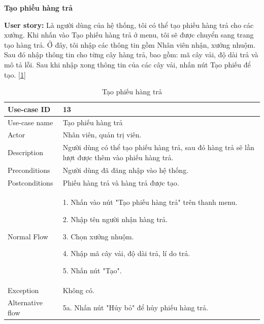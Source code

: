 \newpage
\textbf{Tạo phiếu hàng trả}\par
\textbf{User story:} Là người dùng của hệ thống, tôi có thể tạo phiếu hàng trả cho các xưởng. Khi nhấn vào Tạo phiếu hàng trả ở menu, tôi sẽ được chuyển sang trang tạo hàng trả. Ở đây, tôi nhập các thông tin gồm Nhân viên nhận, xưởng nhuộm. Sau đó nhập thông tin cho từng cây hàng trả, bao gồm: mã cây vải, độ dài trả và mô tả lỗi. Sau khi nhập xong thông tin của các cây vải, nhấn nút Tạo phiếu để tạo. [\ref{bang13}]
\begin{table}[!htp]
    \centering
    \begin{tabular}{|m{3cm}|m{10cm}|}
    \hline 
        Use-case ID & 13\\ \hline
        Use-case name & Tạo phiếu hàng trả\\ \hline
        Actor & Nhân viên, quản trị viên.\\ \hline
        Description & Người dùng có thể tạo phiếu hàng trả, sau đó hàng trả sẽ lần lượt được thêm vào phiếu hàng trả.\\ \hline
        Preconditions & Người dùng đã đăng nhập vào hệ thống.\\ \hline
        Postconditions & Phiếu hàng trả và hàng trả được tạo.\\ \hline
        Normal Flow & 
        1. Nhấn vào nút "Tạo phiếu hàng trả" trên thanh menu.\par 
        2. Nhập tên người nhận hàng trả.\par
        3. Chọn xưởng nhuộm.\par 
        4. Nhập mã cây vải, độ dài trả, lí do trả.\par
        5. Nhấn nút "Tạo".
        \\ \hline
        Exception & Không có.
        \\ \hline
        Alternative flow & 
        5a. Nhấn nút "Hủy bỏ" để hủy phiếu hàng trả.
        \\ 
    \hline 
    \end{tabular}
    \caption{Tạo phiếu hàng trả}
    \label{bang13}
\end{table}

